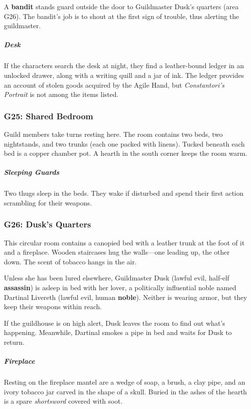 \documentclass[10pt,a4paper,twoside,bg=print,twocolumn,openany,nodeprecatedcode]{dndbook}
\begin{document}
A \textbf{bandit} stands guard outside the door to Guildmaster Dusk's quarters (area G26). The bandit's job is to shout at the first sign of trouble, thus alerting the guildmaster.

\subparagraph{Desk}
If the characters search the desk at night, they find a leather-bound ledger in an unlocked drawer, along with a writing quill and a jar of ink. The ledger provides an account of stolen goods acquired by the Agile Hand, but \textit{Constantori's Portrait} is not among the items listed.

\subsubsection{G25: Shared Bedroom}
Guild members take turns resting here. The room contains two beds, two nightstands, and two trunks (each one packed with linens). Tucked beneath each bed is a copper chamber pot. A hearth in the south corner keeps the room warm.

\subparagraph{Sleeping Guards}
Two thugs sleep in the beds. They wake if disturbed and spend their first action scrambling for their weapons.

\subsubsection{G26: Dusk's Quarters}
\begin{DndReadAloud}{}
This circular room contains a canopied bed with a leather trunk at the foot of it and a fireplace. Wooden staircases hug the walls—one leading up, the other down. The scent of tobacco hangs in the air.

\end{DndReadAloud}

Unless she has been lured elsewhere, Guildmaster Dusk (lawful evil, half-elf \textbf{assassin}) is asleep in bed with her lover, a politically influential noble named Dartinal Livereth (lawful evil, human \textbf{noble}). Neither is wearing armor, but they keep their weapons within reach.

If the guildhouse is on high alert, Dusk leaves the room to find out what's happening. Meanwhile, Dartinal smokes a pipe in bed and waits for Dusk to return.

\subparagraph{Fireplace}
Resting on the fireplace mantel are a wedge of soap, a brush, a clay pipe, and an ivory tobacco jar carved in the shape of a skull. Buried in the ashes of the hearth is a spare \textit{shortsword} covered with soot.
\end{document}

